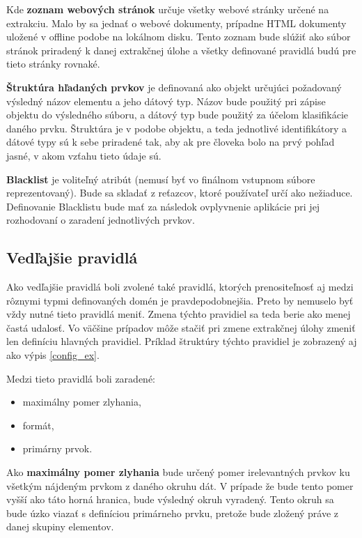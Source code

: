 \bigskip

Kde \textbf{zoznam webových stránok} určuje všetky webové stránky určené na extrakciu. Malo by sa jednať o webové dokumenty, prípadne HTML dokumenty uložené v offline podobe na lokálnom disku. Tento zoznam bude slúžiť ako súbor stránok priradený k danej extrakčnej úlohe a všetky definované pravidlá budú pre tieto stránky rovnaké. 

\bigskip

\textbf{Štruktúra hľadaných prvkov} je definovaná ako objekt určujúci požadovaný výsledný názov elementu a jeho  dátový typ. Názov bude použitý pri zápise objektu do výsledného súboru, a dátový typ bude použitý za účelom klasifikácie daného prvku. Štruktúra je v podobe objektu, a teda jednotlivé identifikátory a dátové typy sú k sebe priradené tak, aby ak pre človeka bolo na prvý pohľad jasné, v akom vzťahu tieto údaje sú.

\bigskip

\textbf{Blacklist} je voliteľný atribút (nemusí byť vo finálnom vstupnom súbore reprezentovaný). Bude sa skladať z reťazcov, ktoré používateľ určí ako nežiaduce. Definovanie Blacklistu bude mať za následok ovplyvnenie aplikácie pri jej rozhodovaní o zaradení jednotlivých prvkov.


\subsection{Vedľajšie pravidlá}

Ako vedľajšie pravidlá boli zvolené také pravidlá, ktorých prenositeľnosť aj medzi rôznymi typmi definovaných domén je pravdepodobnejšia. Preto by nemuselo byť vždy nutné tieto pravidlá meniť. Zmena týchto pravidiel sa teda berie ako menej častá udalosť. Vo väčšine prípadov môže stačiť pri zmene extrakčnej úlohy zmeniť len definíciu hlavných pravidiel. Príklad štruktúry týchto pravidiel je zobrazený aj ako výpis \ref{config_ex}.

Medzi tieto pravidlá boli zaradené:
\begin{itemize}
    \item maximálny pomer zlyhania,
    \item formát,
    \item primárny prvok.
\end{itemize}

\bigskip

Ako \textbf{maximálny pomer zlyhania} bude určený pomer irelevantných prvkov ku všetkým nájdeným prvkom z daného okruhu dát. V prípade že bude tento pomer vyšší ako táto horná hranica, bude výsledný okruh vyradený. Tento okruh sa bude úzko viazať s definíciou primárneho prvku, pretože bude zložený práve z danej skupiny elementov. 

